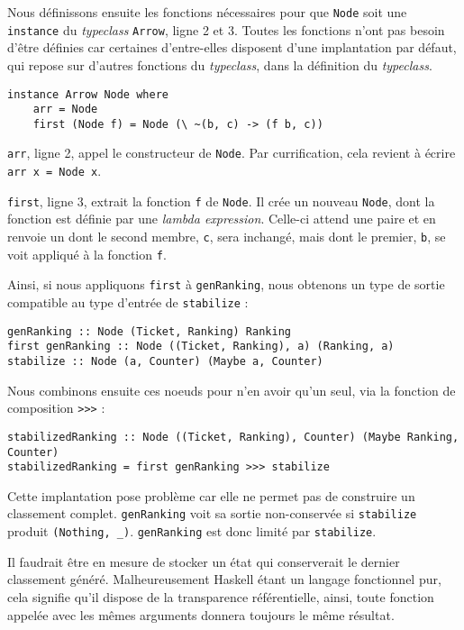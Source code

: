 \documentclass{llncs}
\newcommand{\Arrv}{\lstinline{Arrow}, }
\begin{document}
Nous définissons ensuite les fonctions nécessaires pour que \lstinline{Node} soit
une \lstinline{instance} du \emph{typeclass} \Arrv ligne 2 et 3.
Toutes les fonctions n'ont pas besoin d'être définies car certaines d'entre-elles
disposent d'une implantation par défaut, qui repose sur d'autres fonctions du
\emph{typeclass}, dans la définition du \emph{typeclass}.

\begin{lstlisting}
instance Arrow Node where
    arr = Node
    first (Node f) = Node (\ ~(b, c) -> (f b, c))
\end{lstlisting}

\lstinline{arr}, ligne 2, appel le constructeur de \lstinline{Node}.
Par currification, cela revient à écrire \lstinline{arr x = Node x}.

\lstinline{first}, ligne 3, extrait la fonction \lstinline{f} de \lstinline{Node}.
Il crée un nouveau \lstinline{Node}, dont la fonction est définie par
une \emph{lambda expression}.
Celle-ci attend une paire et en renvoie un dont le second membre, \lstinline{c},
sera inchangé, mais dont le premier, \lstinline{b}, se voit appliqué à la fonction \lstinline{f}.

Ainsi, si nous appliquons \lstinline{first} à \lstinline{genRanking}, nous obtenons
un type de sortie compatible au type d'entrée de \lstinline{stabilize} :
\begin{lstlisting}
genRanking :: Node (Ticket, Ranking) Ranking
first genRanking :: Node ((Ticket, Ranking), a) (Ranking, a)
stabilize :: Node (a, Counter) (Maybe a, Counter)
\end{lstlisting}

Nous combinons ensuite ces noeuds pour n'en avoir qu'un seul, via la fonction
de composition \lstinline{>>>} :
\begin{lstlisting}
stabilizedRanking :: Node ((Ticket, Ranking), Counter) (Maybe Ranking, Counter)
stabilizedRanking = first genRanking >>> stabilize
\end{lstlisting}

Cette implantation pose problème car elle ne permet pas de construire un classement
complet. \lstinline{genRanking} voit sa sortie non-conservée si \lstinline{stabilize}
produit \lstinline{(Nothing, _)}.
\lstinline{genRanking} est donc limité par \lstinline{stabilize}.

Il faudrait être en mesure de stocker un état qui conserverait le dernier classement
généré.
Malheureusement Haskell étant un langage fonctionnel pur, cela signifie qu'il dispose
de la transparence référentielle, ainsi, toute fonction appelée avec les mêmes arguments
donnera toujours le même résultat.
\end{document}

